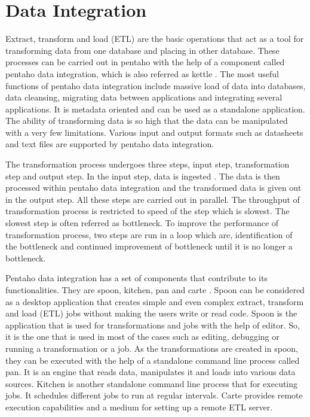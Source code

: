 \documentclass[9pt,twocolumn,twoside]{styles/osajnl}
\begin{document}
\section{Data Integration}

Extract, transform and load (ETL) are the basic operations that act as
a tool for transforming data from one database and placing in other
database. These processes can be carried out in pentaho with the help
of a component called pentaho data integration, which is also referred
as kettle \cite{pent4}. The most useful functions of pentaho data
integration include massive load of data into databases, data
cleansing, migrating data between applications and integrating several
applications. It is metadata oriented and can be used as a standalone
application. The ability of transforming data is so high that the data
can be manipulated with a very few limitations. Various input and
output formats such as datasheets and text files are supported by
pentaho data integration.

The transformation process undergoes three steps, input step,
transformation step and output step. In the input step, data is
ingested \cite{pent5}. The data is then processed within pentaho data
integration and the transformed data is given out in the output
step. All these steps are carried out in parallel. The throughput of
transformation process is restricted to speed of the step which is
slowest. The slowest step is often referred as bottleneck. To improve
the performance of transformation process, two steps are run in a loop
which are, identification of the bottleneck and continued improvement
of bottleneck until it is no longer a bottleneck.

Pentaho data integration has a set of components that contribute to
its functionalities. They are spoon, kitchen, pan and carte
\cite{pent6}. Spoon can be considered as a desktop application that
creates simple and even complex extract, transform and load (ETL) jobs
without making the users write or read code. Spoon is the application
that is used for transformations and jobs with the help of editor. So,
it is the one that is used in most of the cases such as editing,
debugging or running a transformation or a job. As the transformations
are created in spoon, they can be executed with the help of a
standalone command line process called pan. It is an engine that reads
data, manipulates it and loads into various data sources. Kitchen is
another standalone command line process that for executing jobs. It
schedules different jobs to run at regular intervals. Carte provides
remote execution capabilities and a medium for setting up a remote ETL
server.
\end{document}
